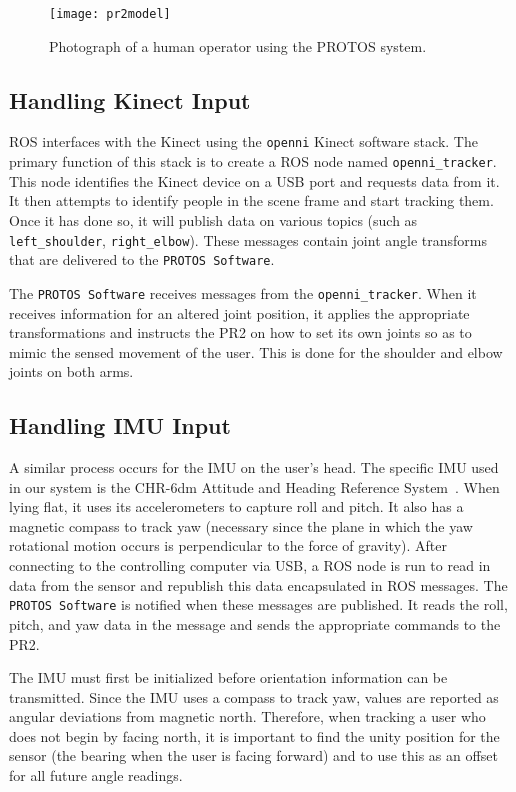 \documentclass{sig-alternate}
\begin{document}
\begin{figure}[htb] 
	\begin{center}
		\texttt{[image: pr2model]}
	\end{center}
	\caption{Photograph of a human operator using the PROTOS system.}
	\label{fig:human_model}
\end{figure}

\subsection{Handling Kinect Input}
\indent ROS interfaces with the Kinect using the {\tt openni} Kinect software stack. The primary
function of this stack is to create a ROS node named {\tt openni\_tracker}. This
node identifies the Kinect device on a USB port and requests data
from it. It then attempts to identify people in the scene frame and start
tracking them. Once it has done so, it will publish data on various
topics (such as {\tt left\_shoulder}, {\tt right\_elbow}). These messages
contain joint angle transforms that are delivered to the {\tt PROTOS Software}.

\indent The {\tt PROTOS Software} receives messages from the
 {\tt openni\_tracker}.
When it receives information for an altered joint position, it applies the
appropriate transformations and instructs the PR2 on how to set its own joints
so as to mimic the sensed movement of the user. This is done for the shoulder
and elbow joints on both arms.

\subsection{Handling IMU Input}
\indent A similar process occurs for the IMU on the user's head. The specific IMU used in our system is
the CHR-6dm Attitude and Heading Reference System~\cite{imu_chr}. When lying flat, it uses its
accelerometers to capture roll and pitch. It also has a magnetic compass to 
track yaw (necessary since the plane in which the yaw rotational motion occurs
is perpendicular to the force of gravity). After connecting to the 
controlling computer via USB, a ROS node is run to read in data from the sensor and republish this data
encapsulated in ROS messages. The {\tt PROTOS Software} is notified when these
messages are published. It reads the roll, pitch, and yaw data in the message
and sends the appropriate commands to the PR2.

\indent The IMU must first be initialized before orientation information can be transmitted. Since the IMU uses a compass
to track yaw, values are reported as angular deviations from magnetic north.
Therefore, when tracking a user who does not begin by facing north, it is 
important to find the unity position for the sensor (the bearing when 
the user is facing forward) and to use this as an offset for all future angle
readings.
\end{document}
